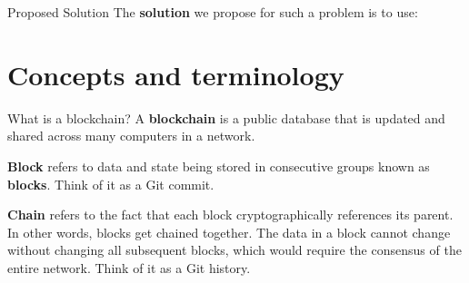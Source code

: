 \documentclass[aspectratio=169,usenames,dvipsnames,pdftex]{beamer}
\begin{document}
  \begin{frame}{Proposed Solution}
    The \textbf{solution} we propose for such a problem is to use:
    \begin{itemize}
    \end{itemize}
  \end{frame}

  \section{Concepts and terminology}

  \begin{frame}{What is a blockchain?}
    A \textbf{blockchain} is a public database that is updated and shared across many computers in a network.

    \textbf{Block} refers to data and state being stored in consecutive groups known as \textbf{blocks}. Think of it as a Git commit.

    \textbf{Chain} refers to the fact that each block cryptographically references its parent. In other words, blocks get chained together. The data in a block cannot change without changing all subsequent blocks, which would require the consensus of the entire network. Think of it as a Git history.
  \end{frame}
\end{document}
